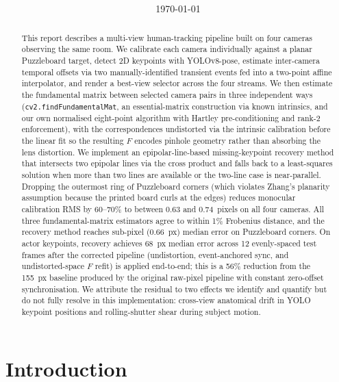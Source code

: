\documentclass[twocolumn]{article}
\title{\vspace{-2.0cm}\large\bfseries \aetitle\vspace{-0.4cm}}
\author{\normalsize \studentOne}
\date{\vspace{-0.3cm}\small\today\vspace{-0.4cm}}
\begin{document}
\maketitle

\begin{abstract}
This report describes a multi-view human-tracking pipeline built on four
cameras observing the same room. We calibrate each camera individually
against a planar Puzzleboard target, detect 2D keypoints with
YOLOv8-pose, estimate inter-camera temporal offsets via two
manually-identified transient events fed into a two-point affine
interpolator, and render a best-view selector across the four
streams. We then estimate the fundamental matrix between selected
camera pairs in three independent ways (\texttt{cv2.findFundamentalMat},
an essential-matrix construction via known intrinsics, and our own
normalised eight-point algorithm with Hartley pre-conditioning and
rank-2 enforcement), with the correspondences undistorted via the
intrinsic calibration before the linear fit so the resulting $F$
encodes pinhole geometry rather than absorbing the lens distortion.
We implement an epipolar-line-based missing-keypoint recovery method
that intersects two epipolar lines via the cross product and falls
back to a \mbox{least-squares} solution when more than two lines are
available or the two-line case is near-parallel. Dropping the
outermost ring of Puzzleboard corners (which violates Zhang's
planarity assumption because the printed board curls at the edges)
reduces monocular calibration RMS by 60--70\% to between 0.63 and
0.74~pixels on all four cameras. All three fundamental-matrix
estimators agree to within 1\% Frobenius distance, and the recovery
method reaches sub-pixel (0.66~px) median error on Puzzleboard
corners. On actor keypoints, recovery achieves 68~px median error
across 12 evenly-spaced test frames after the corrected pipeline
(undistortion, event-anchored sync, and undistorted-space $F$
refit) is applied end-to-end; this is a 56\% reduction from the
155~px baseline produced by the original raw-pixel pipeline with
constant zero-offset synchronisation. We attribute the residual to
two effects we identify and quantify but do not fully resolve in
this implementation: cross-view anatomical drift in YOLO keypoint
positions and rolling-shutter shear during subject motion.
\end{abstract}

\section{Introduction}
\label{sec:intro}
\end{document}
